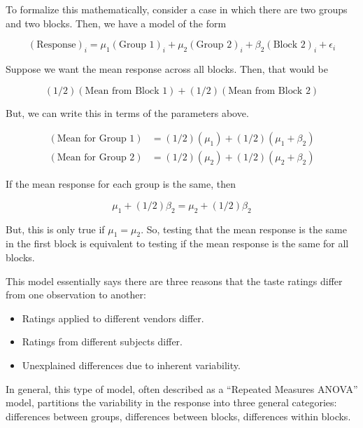 \documentclass[
]{book}
\providecommand{\tightlist}{%
  \setlength{\itemsep}{0pt}\setlength{\parskip}{0pt}}
\theoremstyle{plain}
\theoremstyle{mydefn}
\theoremstyle{myexmpl}
\theoremstyle{remark}
\begin{document}
\begin{rmdtip}
To formalize this mathematically, consider a case in which there are two groups and two blocks. Then, we have a model of the form

\[(\text{Response})_i = \mu_1 (\text{Group 1})_i + \mu_2 (\text{Group 2})_i + \beta_2 (\text{Block 2})_i + \epsilon_i\]

Suppose we want the mean response across all blocks. Then, that would be

\[(1/2)(\text{Mean from Block 1}) + (1/2)(\text{Mean from Block 2})\]

But, we can write this in terms of the parameters above.

\[
\begin{aligned}
  (\text{Mean for Group 1}) &= (1/2)\left(\mu_1\right) + (1/2)\left(\mu_1 + \beta_2\right) \\
  (\text{Mean for Group 2}) &= (1/2)\left(\mu_2\right) + (1/2)\left(\mu_2 + \beta_2\right) 
\end{aligned}
\]

If the mean response for each group is the same, then

\[\mu_1 + (1/2)\beta_2 = \mu_2 + (1/2)\beta_2\]

But, this is only true if \(\mu_1 = \mu_2\). So, testing that the mean response is the same in the first block is equivalent to testing if the mean response is the same for all blocks.
\end{rmdtip}

This model essentially says there are three reasons that the taste ratings differ from one observation to another:

\begin{itemize}
\tightlist
\item
  Ratings applied to different vendors differ.
\item
  Ratings from different subjects differ.
\item
  Unexplained differences due to inherent variability.
\end{itemize}

In general, this type of model, often described as a ``Repeated Measures ANOVA'' model, partitions the variability in the response into three general categories: differences between groups, differences between blocks, differences within blocks.
\end{document}
